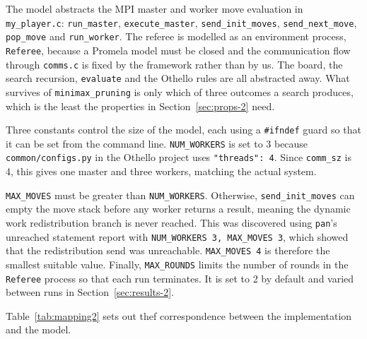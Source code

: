 \documentclass[10pt,a4paper]{article}
\newcommand{\code}[1]{\texttt{#1}}
\begin{document}
The model abstracts the MPI master and worker move evaluation in
\code{my\_player.c}: \code{run\_master}, \code{execute\_master},
\code{send\_init\_moves}, \code{send\_next\_move}, \code{pop\_move} and
\code{run\_worker}. The referee is modelled as an environment process,
\code{Referee}, because a Promela model must be closed and the
communication flow through \code{comms.c} is fixed by the framework rather
than by us. The board, the search recursion, \code{evaluate} and the
Othello rules are all abstracted away. What survives of
\code{minimax\_pruning} is only which of three outcomes a search produces,
which is the least the properties in Section~\ref{sec:props-2} need.

Three constants control the size of the model, each using a \code{\#ifndef} 
guard so that it can be set from the command line. \code{NUM\_WORKERS} is set 
to 3 because \code{common/configs.py} in the Othello project uses 
\code{"threads": 4}. Since \code{comm\_sz} is 4, this gives one master and 
three workers, matching the actual system.

\code{MAX\_MOVES} must be greater than \code{NUM\_WORKERS}. Otherwise, 
\code{send\_init\_moves} can empty the move stack before any worker returns a 
result, meaning the dynamic work redistribution branch is never reached. This 
was discovered using \code{pan}'s unreached statement report with 
\code{NUM\_WORKERS 3, MAX\_MOVES 3}, which showed that the redistribution send 
was unreachable. \code{MAX\_MOVES 4} is therefore the smallest suitable value.
Finally, \code{MAX\_ROUNDS} limits the number of rounds in the \code{Referee} 
process so that each run terminates. It is set to 2 by default and varied 
between runs in Section~\ref{sec:results-2}.

Table~\ref{tab:mapping2} sets out thef
correspondence between the implementation and the model.
\end{document}
